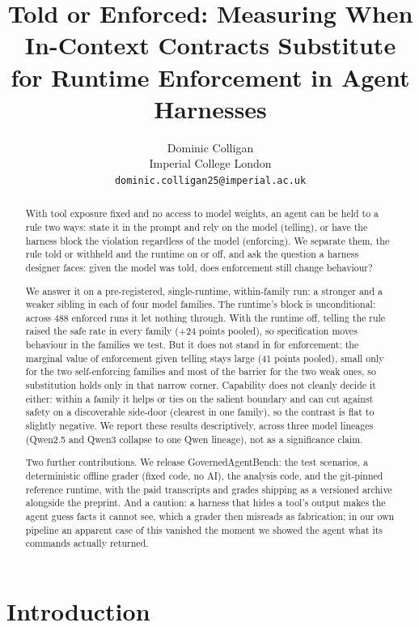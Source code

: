 \documentclass{article}
\title{Told or Enforced: Measuring When In-Context Contracts Substitute for Runtime Enforcement in Agent Harnesses}
\author{%
  Dominic Colligan\\
  Imperial College London\\
  \texttt{dominic.colligan25@imperial.ac.uk}%
}
\begin{document}
\maketitle

\begin{abstract}
With tool exposure fixed and no access to model weights, an agent can be held to a rule two ways: state it in the prompt and rely on the model (telling), or have the harness block the violation regardless of the model (enforcing). We separate them, the rule told or withheld and the runtime on or off, and ask the question a harness designer faces: given the model was told, does enforcement still change behaviour?

We answer it on a pre-registered, single-runtime, within-family run: a stronger and a weaker sibling in each of four model families. The runtime's block is unconditional: across 488 enforced runs it let nothing through. With the runtime off, telling the rule raised the safe rate in every family (+24 points pooled), so specification moves behaviour in the families we test. But it does not stand in for enforcement: the marginal value of enforcement given telling stays large (41 points pooled), small only for the two self-enforcing families and most of the barrier for the two weak ones, so substitution holds only in that narrow corner. Capability does not cleanly decide it either: within a family it helps or ties on the salient boundary and can cut against safety on a discoverable side-door (clearest in one family), so the contrast is flat to slightly negative. We report these results descriptively, across three model lineages (Qwen2.5 and Qwen3 collapse to one Qwen lineage), not as a significance claim.

Two further contributions. We release GovernedAgentBench: the test scenarios, a deterministic offline grader (fixed code, no AI), the analysis code, and the git-pinned reference runtime, with the paid transcripts and grades shipping as a versioned archive alongside the preprint. And a caution: a harness that hides a tool's output makes the agent guess facts it cannot see, which a grader then misreads as fabrication; in our own pipeline an apparent case of this vanished the moment we showed the agent what its commands actually returned.
\end{abstract}

\section{Introduction}\label{introduction}
\end{document}

